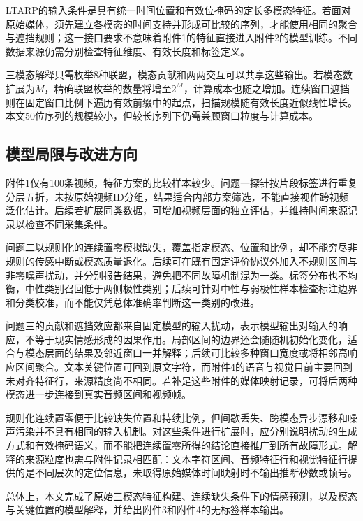 LTARP的输入条件是具有统一时间位置和有效位掩码的定长多模态特征。若面对原始媒体，须先建立各模态的时间支持并形成可比较的序列，才能使用相同的聚合与遮挡规则；这一接口要求不意味着附件1的特征直接进入附件2的模型训练。不同数据来源仍需分别检查特征维度、有效长度和标签定义。

\noindent\begin{minipage}{\textwidth}
\setlength{\parindent}{2em}\indent 三模态解释只需枚举8种联盟，模态贡献和两两交互可以共享这些输出。若模态数扩展为$M$，精确联盟枚举的数量将增至$2^M$，计算成本也随之增加。连续窗口遮挡则在固定窗口比例下遍历有效前缀中的起点，扫描规模随有效长度近似线性增长。本文50位序列的规模较小，但较长序列下仍需兼顾窗口粒度与计算成本。

\subsection{模型局限与改进方向}\label{subsec:evaluation_limits}

附件1仅有100条视频，特征方案的比较样本较少。问题一探针按片段标签进行重复分层五折，未按原始视频ID分组，结果适合内部方案筛选，不能直接视作跨视频泛化估计。后续若扩展同类数据，可增加视频层面的独立评估，并维持时间来源记录以检查不同采集条件。

问题二以规则化的连续置零模拟缺失，覆盖指定模态、位置和比例，却不能穷尽非规则的传感中断或模态质量退化。后续可在既有固定评价协议外加入不规则区间与非零噪声扰动，并分别报告结果，避免把不同故障机制混为一类。标签分布也不均衡，中性类别召回低于两侧极性类别；后续可针对中性与弱极性样本检查标注边界和分类校准，而不能仅凭总体准确率判断这一类别的改进。

问题三的贡献和遮挡效应都来自固定模型的输入扰动，表示模型输出对输入的响应，不等于现实情感形成的因果作用。局部区间的边界还会随随机初始化变化，适合与模态层面的结果及邻近窗口一并解释；后续可比较多种窗口宽度或将相邻高响应区间聚合。文本关键位置可回到原文字符，而附件4的语音与视觉目前主要回到未对齐特征行，来源精度尚不相同。若补足这些附件的媒体映射记录，可将后两种模态进一步连接到真实音频区间和视频帧。

规则化连续置零便于比较缺失位置和持续比例，但间歇丢失、跨模态异步漂移和噪声污染并不具有相同的输入机制。对这些条件进行扩展时，应分别说明扰动的生成方式和有效掩码语义，而不能把连续置零所得的结论直接推广到所有故障形式。解释的来源粒度也需与附件记录相匹配：文本字符区间、音频特征行和视觉特征行提供的是不同层次的定位信息，未取得原始媒体时间映射时不输出推断秒数或帧号。

总体上，本文完成了原始三模态特征构建、连续缺失条件下的情感预测，以及模态与关键位置的模型解释，并给出附件3和附件4的无标签样本输出。
\end{minipage}
